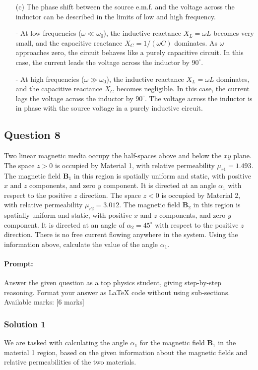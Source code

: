 \documentclass{article}
\begin{document}
\begin{enumerate}
    \item[(c)] The phase shift between the source e.m.f. and the voltage across the inductor can be described in the limits of low and high frequency.

    - At low frequencies ($\omega \ll \omega_0$), the inductive reactance $X_L = \omega L$ becomes very small, and the capacitive reactance $X_C = 1/(\omega C)$ dominates. As $\omega$ approaches zero, the circuit behaves like a purely capacitive circuit. In this case, the current leads the voltage across the inductor by $90^\circ$.
    
    - At high frequencies ($\omega \gg \omega_0$), the inductive reactance $X_L = \omega L$ dominates, and the capacitive reactance $X_C$ becomes negligible. In this case, the current lags the voltage across the inductor by $90^\circ$. The voltage across the inductor is in phase with the source voltage in a purely inductive circuit.
\end{enumerate}


\subsection{Question 8}
 Two linear magnetic media occupy the half-spaces above and below the $xy$ plane. The space $z > 0$ is occupied by Material 1, with relative permeability $\mu_{r1} = 1.493$. The magnetic field $\mathbf{B}_1$ in this region is spatially uniform and static, with positive $x$ and $z$ components, and zero $y$ component. It is directed at an angle $\alpha_1$ with respect to the positive $z$ direction. The space $z < 0$ is occupied by Material 2, with relative permeability $\mu_{r2} = 3.012$. The magnetic field $\mathbf{B}_2$ in this region is spatially uniform and static, with positive $x$ and $z$ components, and zero $y$ component. It is directed at an angle of $\alpha_2 = 45^\circ$ with respect to the positive $z$ direction. There is no free current flowing anywhere in the system. Using the information above, calculate the value of the angle $\alpha_1$.

\paragraph{Prompt: \\} 
Answer the given question as a top physics student, giving step-by-step reasoning. Format your answer as LaTeX code without using sub-sections. Available marks: [6 marks]

\subsubsection{Solution 1}
We are tasked with calculating the angle $\alpha_1$ for the magnetic field $\mathbf{B}_1$ in the material 1 region, based on the given information about the magnetic fields and relative permeabilities of the two materials.
\end{document}
